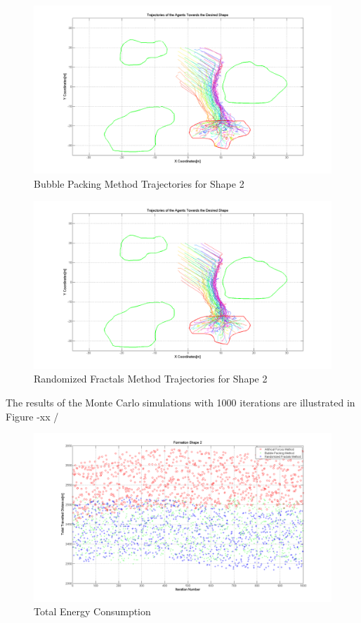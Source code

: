 \documentclass[twoside]{article}
\begin{document}
		   \begin{figure}[H]
		   	\caption{Bubble Packing Method Trajectories for Shape 2}
		   	\centerline{\includegraphics[scale = 0.35]{Bubble_Trajectories_2}}
		   \end{figure} 	
		   
		   \begin{figure}[H]
		   	\caption{Randomized Fractals Method Trajectories for Shape 2}
		   	\centerline{\includegraphics[scale = 0.35]{Randomized_Trajectories_2}}
		   \end{figure} 	
		   
        The results of the Monte Carlo simulations with 1000 iterations are illustrated in Figure -xx /
		   \begin{figure}[H]
		   	\caption{Total Energy Consumption}
		   	\centerline{\includegraphics[scale = 0.35]{Total_Energy_Shape_2}}
		   \end{figure} 	
		   
\end{document}
